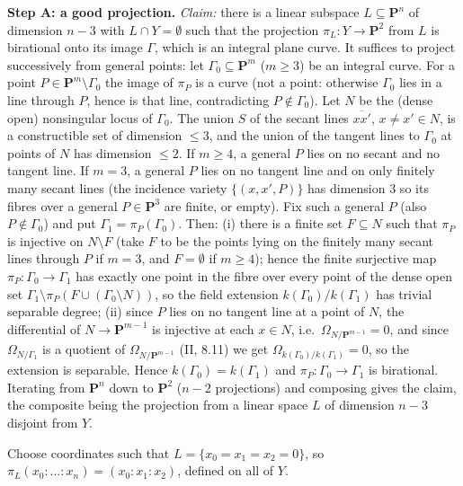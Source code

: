 \documentclass[11pt]{article}
\begin{document}
\textbf{Step A: a good projection.} \emph{Claim:} there is a linear subspace $L\subseteq\mathbf P^n$ of dimension $n-3$ with $L\cap Y=\emptyset$ such that the projection $\pi_L:Y\to\mathbf P^2$ from $L$ is birational onto its image $\Gamma$, which is an integral plane curve. It suffices to project successively from general points: let $\Gamma_0\subseteq\mathbf P^m$ ($m\ge3$) be an integral curve. For a point $P\in\mathbf P^m\setminus\Gamma_0$ the image of $\pi_P$ is a curve (not a point: otherwise $\Gamma_0$ lies in a line through $P$, hence is that line, contradicting $P\notin\Gamma_0$). Let $N$ be the (dense open) nonsingular locus of $\Gamma_0$. The union $S$ of the secant lines $\overline{xx'}$, $x\ne x'\in N$, is a constructible set of dimension $\le3$, and the union of the tangent lines to $\Gamma_0$ at points of $N$ has dimension $\le2$. If $m\ge4$, a general $P$ lies on no secant and no tangent line. If $m=3$, a general $P$ lies on no tangent line and on only finitely many secant lines (the incidence variety $\{(x,x',P)\}$ has dimension $3$ so its fibres over a general $P\in\mathbf P^3$ are finite, or empty). Fix such a general $P$ (also $P\notin\Gamma_0$) and put $\Gamma_1=\pi_P(\Gamma_0)$. Then: (i) there is a finite set $F\subseteq N$ such that $\pi_P$ is injective on $N\setminus F$ (take $F$ to be the points lying on the finitely many secant lines through $P$ if $m=3$, and $F=\emptyset$ if $m\ge4$); hence the finite surjective map $\pi_P:\Gamma_0\to\Gamma_1$ has exactly one point in the fibre over every point of the dense open set $\Gamma_1\setminus\pi_P(F\cup(\Gamma_0\setminus N))$, so the field extension $k(\Gamma_0)/k(\Gamma_1)$ has trivial separable degree; (ii) since $P$ lies on no tangent line at a point of $N$, the differential of $N\to\mathbf P^{m-1}$ is injective at each $x\in N$, i.e.\ $\Omega_{N/\mathbf P^{m-1}}=0$, and since $\Omega_{N/\Gamma_1}$ is a quotient of $\Omega_{N/\mathbf P^{m-1}}$ (II, 8.11) we get $\Omega_{k(\Gamma_0)/k(\Gamma_1)}=0$, so the extension is separable. Hence $k(\Gamma_0)=k(\Gamma_1)$ and $\pi_P:\Gamma_0\to\Gamma_1$ is birational. Iterating from $\mathbf P^n$ down to $\mathbf P^2$ ($n-2$ projections) and composing gives the claim, the composite being the projection from a linear space $L$ of dimension $n-3$ disjoint from $Y$.

Choose coordinates such that $L=\{x_0=x_1=x_2=0\}$, so $\pi_L(x_0:\dots:x_n)=(x_0:x_1:x_2)$, defined on all of $Y$.
\end{document}
